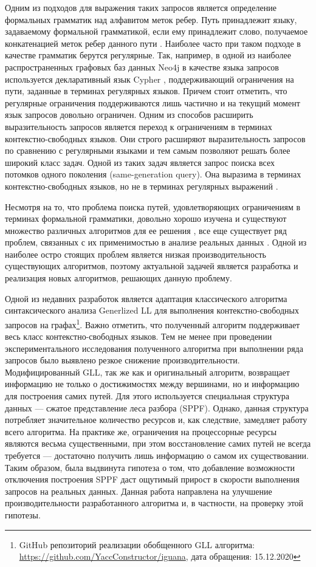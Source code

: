 \documentclass[14pt]{matmex-diploma-custom}
\theoremstyle{definition}
\begin{document}
Одним из подходов для выражения таких запросов является определение формальных грамматик над алфавитом меток ребер. Путь принадлежит языку, задаваемому формальной грамматикой, если ему принадлежит слово, получаемое конкатенацией меток ребер данного пути \cite{arcbool}.  Наиболее часто при таком подходе в качестве грамматик берутся регулярные. Так, например, в одной из наиболее распространенных графовых баз данных Neo4j в качестве языка запросов используется декларативный язык Cypher \cite{cypher}, поддерживающий ограничения на пути, заданные в терминах регулярных языков. Причем стоит отметить, что регулярные ограничения поддерживаются лишь частично и на текущий момент язык запросов довольно ограничен. Одним из способов расширить выразительность запросов является переход к ограничениям в терминах контекстно-свободных языков. Они строго расширяют выразительность запросов по сравнению с регулярными языками и тем самым позволяют решать более широкий класс задач. Одной из таких задач является запрос поиска всех потомков одного поколения (same-generation query). Она выразима в терминах контекстно-свободных языков, но не в терминах регулярных выражений \cite{10.1007/978-3-319-91662-0_17}.

Несмотря на то, что проблема поиска путей, удовлетворяющих ограничениям в терминах формальной грамматики, довольно хорошо изучена и существуют множество различных алгоритмов для ее решения \cite{10.1145/3210259.3210264, zhang2016contextfree, hellings2016querying, medeiros2020algorithm}, все еще существует ряд проблем, связанных с их применимостью в анализе реальных данных \cite{10.1145/3335783.3335791}. Одной из наиболее остро стоящих проблем является низкая производительность существующих алгоритмов, поэтому актуальной задачей является разработка и реализация новых алгоритмов, решающих данную проблему.

Одной из недавних разработок является адаптация классического алгоритма синтаксического анализа Generlized LL для выполнения контекстно-свободных запросов на графах\footnote{GitHub репозиторий реализации обобщенного GLL алгоритма: \url{https://github.com/YaccConstructor/iguana},  дата обращения: 15.12.2020}.
Важно отметить, что полученный алгоритм поддерживает весь класс контекстно-свободных языков. Тем не менее при проведении экспериментального исследования полученного алгоритма при выполнении ряда запросов было выявлено резкое снижение производительности. Модифицированный GLL, так же как и оригинальный алгоритм, возвращает информацию не только о достижимостях между вершинами, но и информацию для построения самих путей. Для этого используется специальная структура данных --- сжатое представление леса разбора (SPPF).
Однако, данная структура потребляет значительное количество ресурсов и, как следствие, замедляет работу всего алгоритма. На практике же, ограничения на процессорные ресурсы являются весьма существенными, при этом восстановление самих путей не всегда требуется --- достаточно получить лишь информацию о самом их существовании. Таким образом, была выдвинута гипотеза о том, что добавление возможности отключения построения SPPF даст ощутимый прирост в скорости выполнения запросов на реальных данных. Данная работа направлена на улучшение производительности разработанного алгоритма и, в частности, на проверку этой гипотезы. 
\end{document}
